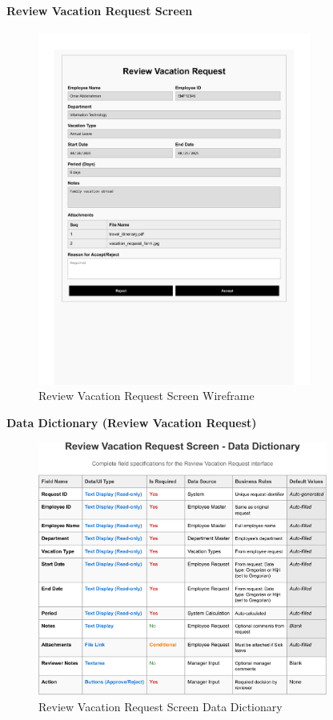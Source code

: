 \documentclass[12pt,a4paper]{article}
\begin{document}
\paragraph{Review Vacation Request Screen}
\begin{figure}[H]
\centering
\includegraphics[width=0.8\textwidth]{Wireframes/Review-Vacation-Request/Review-Vacation-Request-1.png}
\caption{Review Vacation Request Screen Wireframe}
\label{fig:wireframe-review-vacation}
\end{figure}

\noindent\textbf{Data Dictionary (Review Vacation Request)}
\begin{figure}[H]
\centering
\includegraphics[width=0.85\textwidth]{Data-Dictionary/Screen-Data-Dictionaries/Review-Vacation-Request-Screen-Data-Dictionary/Review-Vacation-Request-Screen-Data-Dictionary-1.png}
\caption{Review Vacation Request Screen Data Dictionary}
\label{fig:review-vacation-data-dict-inline}
\end{figure}
\end{document}
